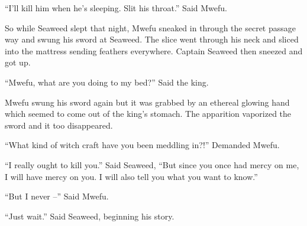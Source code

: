 \tbreak

``I'll kill him when he's sleeping. Slit his throat.'' Said Mwe\-fu.

So while Seaweed slept that night, Mwe\-fu sneaked in through the secret passage way and swung his sword at Seaweed.
The slice went through his neck and sliced into the mattress sending feathers everywhere. Captain Seaweed then sneezed and got up.

``Mwe\-fu, what are you doing to my bed?'' Said the king.

Mwe\-fu swung his sword again but it was grabbed by an ethereal glowing hand which seemed to come out of the king's stomach. The apparition vaporized the sword and it too disappeared.

``What kind of witch craft have you been meddling in?!'' Demanded Mwe\-fu.

``I really ought to kill you.'' Said Seaweed, ``But since you once had mercy on me, I will have mercy on you. I will also tell you what you want to know.''

``But I never --'' Said Mwe\-fu.

``Just wait.'' Said Seaweed, beginning his story.

